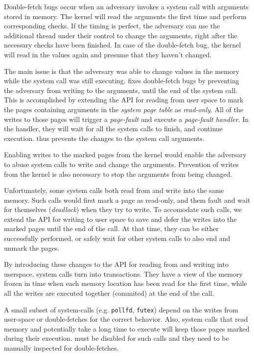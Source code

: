 Double-fetch bugs occur when an adversary invokes a system call with arguments
stored in memory. The kernel will read the arguments the first time and perform
corresponding checks. If the timing is perfect, the adversary can use the
additional thread under their control to change the arguments, right after the
necessary checks have been finished. In case of the double-fetch bug, the kernel
will read in the values again and presume that they haven't changed.

The main issue is that the adversary was able to change values in the memory
while the system call was still executing. \sysname fixes double-fetch bugs by
preventing the adversary from writing to the arguments, until the end of the
system call. This is accomplished by extending the API for reading from user
space to mark the pages containing arguments in the \emph{system page table} as
\emph{read-only}. All of the writes to those pages will trigger a \emph{page-fault}
and execute a \emph{page-fault handler}. In the handler, they will wait for all
the system calls to finish, and continue execution. \sysname thus prevents the
changes to the system call arguments.

Enabling writes to the marked pages from the kernel would enable the adversary
to abuse system calls to write and change the arguments. Prevention of writes
from the kernel is also necessary to stop the arguments from being changed.

Unfortunately, some system calls both read from and write into the same memory.
Such calls would first mark a page as read-only, and them fault and wait for
themselves (\emph{deadlock}) when they try to write. To accomodate such calls,
we extend the API for writing to user space to save and defer the writes into
the marked pages until the end of the call. At that time, they can be either
successfully performed, or safely wait for other system calls to also end and
unmark the pages.

By introducing these changes to the API for reading from and writing into userspace,
system calls turn into transactions. They have a view of the memory frozen in time
when each memory location has been read for the first time, while all the writes
are executed together (commited) at the end of the call.

A small subset of system-calls (e.g. \texttt{pollfd}, \texttt{futex}) depend on
the writes from user-space or double-fetches for the correct behavior. Also,
system calls that read memory and potentially take a long time to execute will
keep those pages marked during their execution. \sysname must be disabled for
such calls and they need to be manually inspected for double-fetches.

